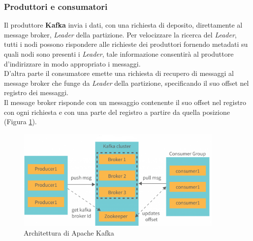 \subsubsection{Produttori e consumatori}
Il produttore \textbf{Kafka} invia i dati, con una richiesta di deposito,  direttamente al \gls{message broker}{}, \textit{Leader} della partizione. Per velocizzare la ricerca del
\textit{Leader}, tutti i nodi possono rispondere alle richieste dei produttori fornendo \gls{metadati}{} su quali nodi sono presenti i \textit{Leader}, tale informazione consentirà al produttore d'indirizzare in modo
appropriato i messaggi.\\
D'altra parte il consumatore emette una richiesta di recupero di messaggi al \gls{message broker}{} che funge da \textit{Leader} della partizione, specificando il suo offset nel registro dei messaggi.\\
Il \gls{message broker}{} risponde con un messaggio contenente il suo offset nel registro con ogni richiesta e con una parte del registro a partire da quella posizione (Figura \ref{fig:kafka_architecture}).
\begin{figure}[h]
    \centering
    \includegraphics[width=0.9\textwidth]{images/componenti/kafka_architetcture.png}
    \caption{Architettura di Apache Kafka}
    \label{fig:kafka_architecture}
\end{figure}

